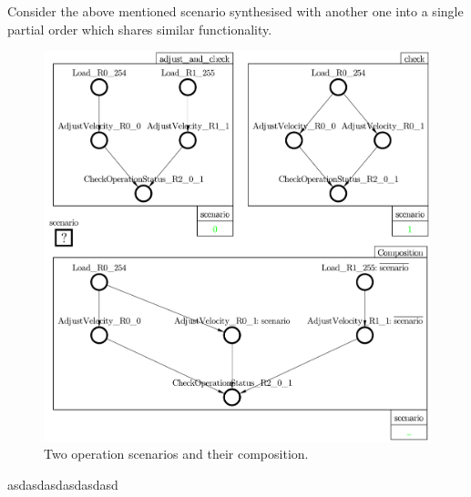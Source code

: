 Consider the above mentioned scenario synthesised with another one into a single
partial order which shares similar functionality.

\begin{figure}
\vspace{-4mm}
\centerline{\includegraphics[scale=0.4]{img/ataed-composition.pdf}}
\caption{Two operation scenarios and their composition.\label{fig-scenarios}}
\vspace{-9mm}
\end{figure}

asdasdasdasdasdasd